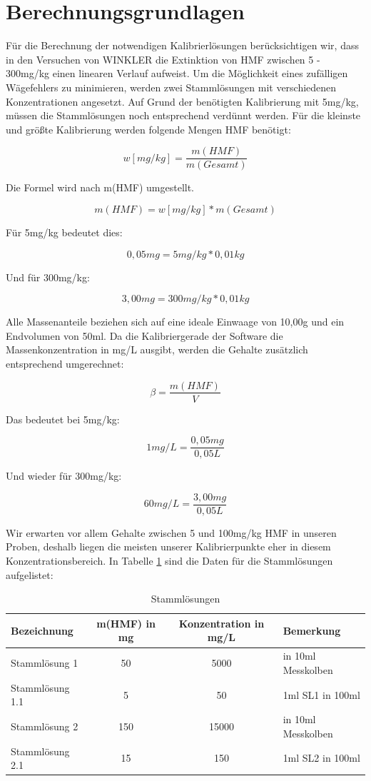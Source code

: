 \section{Berechnungsgrundlagen}
Für die Berechnung der notwendigen Kalibrierlösungen berücksichtigen wir, dass in den Versuchen von WINKLER die Extinktion von HMF zwischen 5 - 300mg/kg einen linearen Verlauf aufweist. Um die Möglichkeit eines zufälligen Wägefehlers zu minimieren, werden zwei Stammlösungen mit verschiedenen Konzentrationen angesetzt. Auf Grund der benötigten Kalibrierung mit 5mg/kg, müssen die Stammlösungen noch entsprechend verdünnt werden. Für die kleinste und größte Kalibrierung werden folgende Mengen HMF benötigt:

	\[w[mg/kg]=\frac{ m(HMF) }{ m(Gesamt) }\]
	
Die Formel wird nach m(HMF) umgestellt.

	\[m(HMF)=w[mg/kg]*m(Gesamt)\]
	
Für 5mg/kg bedeutet dies:
	
	\[0,05mg=5mg/kg*0,01kg\]
	
Und für 300mg/kg:

	\[3,00mg=300mg/kg*0,01kg\]
	
Alle Massenanteile beziehen sich auf eine ideale Einwaage von 10,00g und ein Endvolumen von 50ml.
Da die Kalibriergerade der Software die Massenkonzentration in mg/L ausgibt, werden die Gehalte zusätzlich entsprechend umgerechnet:

\[\beta=\frac{ m(HMF) }{ V }\]

Das bedeutet bei 5mg/kg:

\[1mg/L=\frac{ 0,05mg }{ 0,05L }\]

Und wieder für 300mg/kg:

\[60mg/L=\frac{ 3,00mg }{ 0,05L }\]

Wir erwarten vor allem Gehalte zwischen 5 und 100mg/kg HMF in unseren Proben, deshalb liegen die meisten unserer Kalibrierpunkte eher in diesem Konzentrationsbereich.
In Tabelle \ref{tab:Stammlösungen} sind die Daten für die Stammlösungen aufgelistet:

\begin{table}[htbp]
	\centering
	\caption{Stammlösungen}
		\begin{tabular}{l|c|c|l}
			Bezeichnung & m(HMF) in mg & Konzentration in mg/L & Bemerkung\\
			\hline
			Stammlösung 1 & 50 & 5000  & in 10ml Messkolben\\
			\hline
			Stammlösung 1.1 & 5 & 50 & 1ml SL1 in 100ml\\
			\hline
			Stammlösung 2 & 150 & 15000 & in 10ml Messkolben\\
			\hline
			Stammlösung 2.1 & 15 & 150 & 1ml SL2 in 100ml\\
		\end{tabular}
		\label{tab:Stammlösungen}
\end{table}

